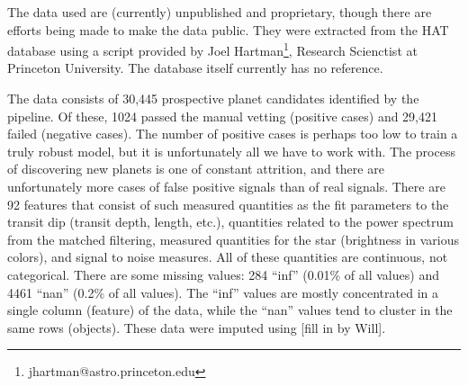 The data used are (currently) unpublished and proprietary, though there are efforts being made to make the data public.  They were extracted from the HAT database using a script provided by Joel Hartman\footnote{jhartman@astro.princeton.edu}, Research Scienctist at Princeton University.  The database itself currently has no reference.

The data consists of 30,445 prospective planet candidates identified by the pipeline.  Of these, 1024 passed the manual vetting (positive cases) and 29,421 failed (negative cases).  The number of positive cases is perhaps too low to train a truly robust model, but it is unfortunately all we have to work with.  The process of discovering new planets is one of constant attrition, and there are unfortunately more cases of false positive signals than of real signals.  There are 92 features that consist of such measured quantities as the fit parameters to the transit dip (transit depth, length, etc.), quantities related to the power spectrum from the matched filtering, measured quantities for the star (brightness in various colors), and signal to noise measures.  All of these quantities are  continuous, not categorical.  There are some missing values: 284 ``inf'' (0.01\% of all values) and 4461 ``nan'' (0.2\% of all values).  The ``inf'' values are mostly concentrated in a single column (feature) of the data, while the ``nan'' values tend to cluster in the same rows (objects).  These data were imputed using [fill in by Will].